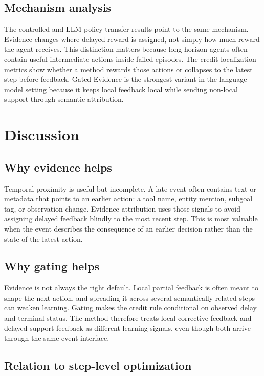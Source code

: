 \documentclass[letterpaper]{article} %
\begin{document}
\subsection{Mechanism analysis}

The controlled and LLM policy-transfer results point to the same mechanism. Evidence changes where delayed reward is assigned, not simply how much reward the agent receives. This distinction matters because long-horizon agents often contain useful intermediate actions inside failed episodes. The credit-localization metrics show whether a method rewards those actions or collapses to the latest step before feedback. Gated Evidence is the strongest variant in the language-model setting because it keeps local feedback local while sending non-local support through semantic attribution.

\section{Discussion}

\subsection{Why evidence helps}

Temporal proximity is useful but incomplete. A late event often contains text or metadata that points to an earlier action: a tool name, entity mention, subgoal tag, or observation change. Evidence attribution uses those signals to avoid assigning delayed feedback blindly to the most recent step. This is most valuable when the event describes the consequence of an earlier decision rather than the state of the latest action.

\subsection{Why gating helps}

Evidence is not always the right default. Local partial feedback is often meant to shape the next action, and spreading it across several semantically related steps can weaken learning. Gating makes the credit rule conditional on observed delay and terminal status. The method therefore treats local corrective feedback and delayed support feedback as different learning signals, even though both arrive through the same event interface.

\subsection{Relation to step-level optimization}
\end{document}
